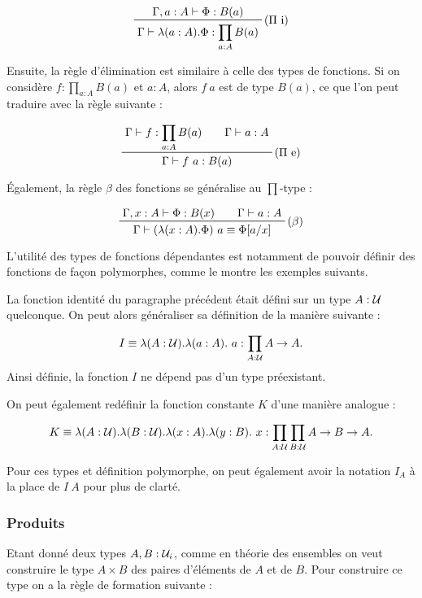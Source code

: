 \documentclass[../../rapport.tex]{subfiles}
\begin{document}
  $$
  \prftree[r]{($\Pi$ i)}{\Gamma, a : A \vdash \Phi : B(a)}
    {\Gamma \vdash \lambda(a : A). \Phi : \prod_{a:A}{B(a)}}
  $$

  Ensuite, la règle d'élimination est similaire à celle des types de fonctions.
  Si on considère $f : \prod_{a:A}B(a)$ et $a : A$, alors $f\ a$ est de type $B(a)$,
  ce que l'on peut traduire avec la règle suivante :

  $$
  \prfinterspace=2em
  \prftree[r]{($\Pi$ e)}{\Gamma \vdash f : \prod_{a:A}{B(a)}}{\Gamma \vdash a : A}
    {\Gamma \vdash f\ a : B(a)}
  $$

  Également, la règle $\beta$ des fonctions se généralise au $\prod$-type :

  $$
  \prfinterspace=2em
  \prftree[r]{($\beta$)}{\Gamma, x : A \vdash \Phi : B(x)}{\Gamma \vdash a : A}
    {\Gamma \vdash (\lambda(x : A).\Phi)\ a \equiv \Phi[a/x]}
  $$

  L'utilité des types de fonctions dépendantes est notamment de pouvoir définir des fonctions de façon polymorphes,
  comme le montre les exemples suivants.

  \begin{example}
    La fonction identité du paragraphe précédent était défini sur un type $A : \mathcal U$ quelconque.
    On peut alors généraliser sa définition de la manière suivante :

    $$I \equiv \lambda (A : \mathcal U). \lambda (a : A).\ a : \prod_{A : \mathcal U}{A \rightarrow A}.$$
    Ainsi définie, la fonction $I$ ne dépend pas d'un type préexistant.

    On peut également redéfinir la fonction constante $K$ d'une manière analogue :

    $$K \equiv \lambda (A : \mathcal U). \lambda (B : \mathcal U). \lambda (x : A). \lambda (y : B).\ x :
      \prod_{A : \mathcal U}\prod_{B : \mathcal U}{A \rightarrow B \rightarrow A}.$$

    Pour ces types et définition polymorphe, on peut également avoir la notation $I_A$ à la place de $I\ A$
    pour plus de clarté.
  \end{example}

  \subsubsection{Produits}

  Etant donné deux types $A, B : \mathcal U_i$, comme en théorie des ensembles on veut construire le type $A \times B$ des paires d'éléments
  de $A$ et de $B$. Pour construire ce type on a la règle de formation suivante :
\end{document}
